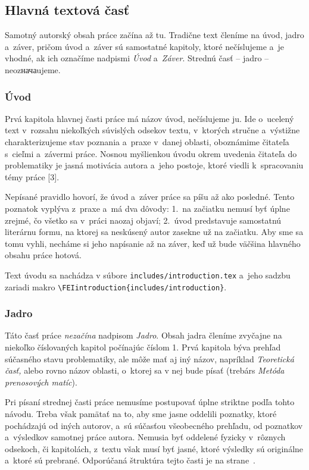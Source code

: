 \documentclass[../../../thesis.tex]{subfiles}
\begin{document}
\subsection{Hlavná textová časť}
Samotný autorský obsah práce začína až tu.
Tradične text členíme na úvod, jadro a~záver,
pričom úvod a~záver sú samostatné kapitoly,
ktoré nečíslujeme a~je vhodné,
ak ich označíme nadpismi \emph{Úvod} a~\emph{Záver}.
Strednú časť -- jadro -- neozначаujeme.

\subsubsection{Úvod}
Prvá kapitola hlavnej časti práce má názov úvod, nečíslujeme ju.
Ide o~ucelený text v~rozsahu niekoľkých súvislých odsekov textu,
v~ktorých stručne a~výstižne charakterizujeme stav poznania
a~praxe v~danej oblasti,
oboznámime čitateľa s~cieľmi a~závermi práce.
Nosnou myšlienkou úvodu okrem uvedenia čitateľa do problematiky
je jasná motivácia autora a~jeho postoje,
ktoré viedli k~spracovaniu témy práce [3].

Nepísané pravidlo hovorí,
že úvod a~záver práce sa píšu až ako posledné.
Tento poznatok vyplýva z~praxe a~má dva dôvody:
1.~na začiatku nemusí byť úplne zrejmé, čo všetko sa v~práci naozaj objaví;
2.~úvod predstavuje samostatnú literárnu formu,
na ktorej sa neskúsený autor zasekne už na začiatku.
Aby sme sa tomu vyhli,
necháme si jeho napísanie až na záver,
keď už bude väčšina hlavného obsahu práce hotová.

Text úvodu sa nachádza v súbore \verb|includes/introduction.tex|
a~jeho sadzbu zariadi makro \verb|\FEIintroduction{includes/introduction}|.

\subsubsection{Jadro}
Táto časť práce \emph{nezačína} nadpisom \emph{Jadro}.
Obsah jadra členíme zvyčajne na niekoľko číslovaných
kapitol počínajúc číslom 1.
Prvá kapitola býva prehľad súčasného stavu problematiky,
ale môže mať aj iný názov,
napríklad \emph{Teoretická časť,} alebo rovno názov oblasti,
o~ktorej sa v nej bude písať
(trebárs \emph{Metóda prenosových matíc}).

Pri písaní strednej časti práce nemusíme postupovať úplne
striktne podľa tohto návodu.
Treba však pamätať na to,
aby sme jasne oddelili poznatky,
ktoré pochádzajú od iných autorov,
a~sú súčasťou všeobecného prehľadu,
od poznatkov a~výsledkov samotnej práce autora.
Nemusia byť oddelené fyzicky v~rôznych odsekoch,
či kapitolách, z~textu však musí byť jasné,
ktoré výsledky sú originálne a~ktoré sú prebrané.
Odporúčaná štruktúra tejto časti je na
strane~\pageref{sec:StrukturaPrace}.
\end{document}
